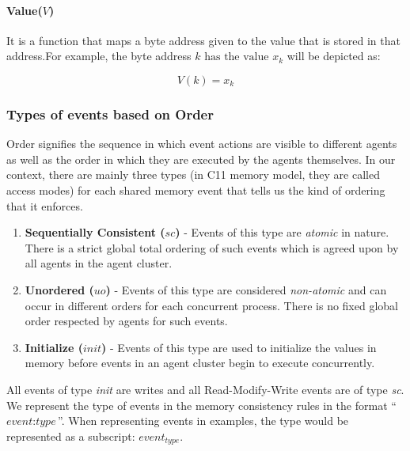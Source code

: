     \paragraph{Value($V$)}  
       It is a function that maps a byte address given to the value that is stored in that address.For example, the byte address $k\text{ has the value } x_k$ will be depicted as:
            
            \[V(k) = x_k\]

        
    
    \subsubsection{Types of events based on Order} 
        Order signifies the sequence in which event actions are visible to different agents as well as the order in which they are executed by the agents themselves. In our context, there are mainly three types (in C11 memory model, they are called access modes) for each shared memory event that tells us the kind of ordering that it enforces. 
        
        \begin{enumerate}
            \item \textbf{Sequentially Consistent ($sc$)} - Events of this type are \textit{atomic} in nature. There is a strict global total ordering of such events which is agreed upon by all agents in the agent cluster. 
            
            \item \textbf{Unordered ($uo$)} - Events of this type are considered \textit{non-atomic} and can occur in different orders for each concurrent process. There is no fixed global order respected by agents for such events. 
            
            \item \textbf{Initialize ($init$)} - Events of this type are used to initialize the values in memory before events in an agent cluster begin to execute concurrently. 
        \end{enumerate}

        All events of type \textit{init} are writes and all Read-Modify-Write events are of type \textit{sc}.  
        We represent the type of events in the memory consistency rules in the format ``$\textit{event} : \textit{type}$''. 
        When representing events in examples, the type would be represented as a subscript: $\textit{event}_\textit{type}$. 
       
